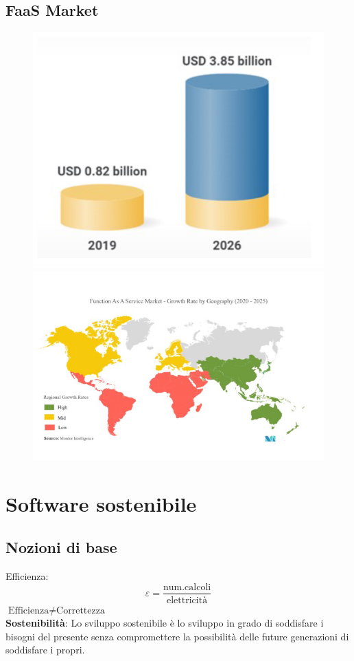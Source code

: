 \documentclass[a4paper, 12pt]{report}
\begin{document}
            \section{FaaS Market}
            \begin{figure}[htbp]
              \centering
              \includegraphics[scale=0.5]{Immagini/FaasMarket.png}
              \includegraphics[scale=0.5]{Immagini/FaasMarket2.png}
            \end{figure}
      \chapter{Software sostenibile}
          \section{Nozioni di base}
          Efficienza: $$\varepsilon = \frac{\text{num.calcoli}}{\text{elettricità}}$$
          $\text{Efficienza} \neq \text{Correttezza}$\\[5px]
          \textbf{Sostenibilità}: Lo sviluppo sostenibile è lo sviluppo in grado di soddisfare i bisogni
          del presente senza compromettere la possibilità delle future
          generazioni di soddisfare i propri.
\end{document}
